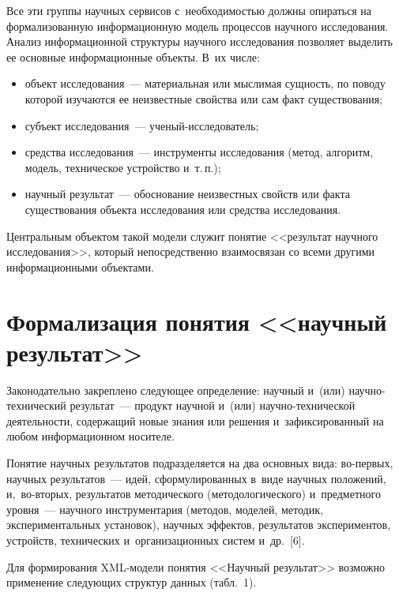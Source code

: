 \begin{multicols}{2}
    Все эти группы научных сервисов с~необхо\-ди\-мостью должны опираться 
на формализованную информационную модель процессов научного 
исследования. Анализ информационной структуры научного исследования 
позволяет выделить ее основные информационные объекты. В~их числе:
    \begin{itemize}
\item объект исследования~--- материальная или мыс\-ли\-мая сущность, по 
поводу которой изучаются ее неизвестные свойства или сам факт 
существования;
\item субъект исследования~--- уче\-ный-ис\-сле\-до\-ва\-тель;
\item средства исследования~--- инструменты исследования (метод, 
алгоритм, модель, техническое устройство и~т.\,п.);
\item научный результат~--- обоснование неизвестных свойств или факта 
существования объекта исследования или средства исследования.
\end{itemize}

    Центральным объектом такой модели служит понятие <<результат 
научного исследования>>, который непосредственно взаимосвязан со всеми 
другими информационными объектами.

\vspace*{-6pt}
    
\section{Формализация понятия <<научный результат>>}

    Законодательно закреплено следующее определение: научный и~(или)  
на\-уч\-но-тех\-ни\-че\-ский результат~--- продукт научной и~(или)  
на\-уч\-но-тех\-ни\-че\-ской деятельности, содержащий новые знания или 
решения и~зафиксированный на любом информационном носителе.
    
    Понятие научных результатов подразделяется на два основных вида:  
во-пер\-вых, научных результатов~--- идей, сформулированных в~виде 
научных положений, и,~во-вто\-рых, результатов методического 
(методологического) и~предметного уровня~--- научного инструментария 
(методов, моделей, методик, экспериментальных установок), научных 
эффектов, результатов экспериментов, устройств, технических 
и~организационных систем и~др.~[6].
    
    Для формирования XML-мо\-де\-ли понятия <<Научный результат>> 
возможно применение сле\-ду\-ющих структур данных (табл.~1).
    


\end{multicols}
